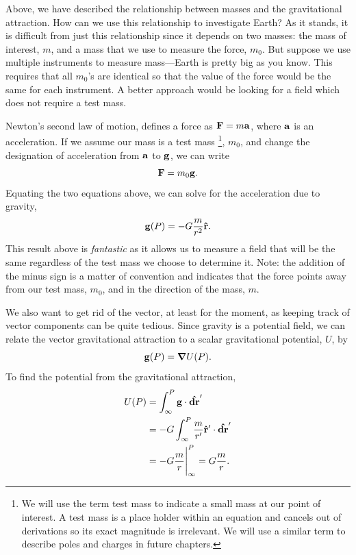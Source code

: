 Above, we have described the relationship between masses and the gravitational attraction.  How can we use this relationship to investigate Earth?  As it stands, it is difficult from just this relationship since it depends on two masses: the mass of interest, $m$, and a mass that we use to measure the force, $m_0$.  But suppose we use multiple instruments to measure mass---Earth is pretty big as you know.  This requires that all $m_0$'s are identical so that the value of the force would be the same for each instrument.  A better approach would be looking for a field which does not require a test mass.

Newton's second law of motion, defines a force as $\vb{F} = m\vb{a}$, where $\vb{a}$ is an acceleration.  If we assume our mass is a test mass
\footnote{We will use the term test mass to indicate a small mass at our point of interest.  A test mass is a place holder within an equation and cancels out of derivations so its exact magnitude is irrelevant.  We will use a similar term to describe poles and charges in future chapters.},
$m_0$, and change the designation of acceleration from $\vb{a}$ to $\vb{g}$, we can write
\begin{equation*}
    \vb{F} = m_0 \vb{g} .
\end{equation*}
Equating the two equations above, we can solve for the acceleration due to
gravity,
\begin{equation}
    \vb{g}(P) = - G \frac{m}{r^2} \vu{r}.
\end{equation}
This result above is {\it fantastic} as it allows us to measure a field that will be the same regardless of the test mass we choose to determine it.  Note: the addition of the minus sign is a matter of convention and indicates that the force points away from our test mass, $m_0$, and in the direction of the mass, $m$.

We also want to get rid of the vector, at least for the moment, as keeping track of vector components can be quite tedious.  Since gravity is a potential field, we can relate the vector gravitational attraction to a scalar gravitational potential, $U$, by
\begin{equation}
    \vb{g}(P) = \grad U(P) .
    \label{eq:gpotential}
\end{equation}
To find the potential from the gravitational attraction,
\begin{align*}
    U(P) &= \int_{\infty}^{P} \vb{g} \cdot \vu{dr}' \\
        &= - G \int_{\infty}^{P} \frac{m}{r'}\vu{r}' \cdot \vu{dr}' \\
        &= -G \Bigg. \frac{m}{r} \Bigg|_\infty^P = G \frac{m}{r} .
\end{align*}

